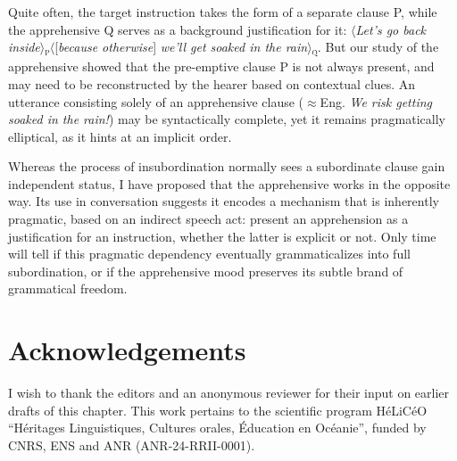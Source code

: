 \documentclass[output=paper,colorlinks,citecolor=brown]{langscibook}
\begin{document}
Quite often, the target instruction takes the form of a separate clause P, while the apprehensive Q serves as a background justification for it: ${\langle}$\textit{Let's go back inside}${\rangle}$\textsc{\textsubscript{p}}${\langle}$[\textit{because otherwise}] \textit{we'll get soaked in the rain}${\rangle}$\textsc{\textsubscript{q}}. But our study of the  apprehensive showed that the pre-emptive clause P is not always present, and may need to be reconstructed by the hearer based on contextual clues. An utterance consisting solely of an apprehensive clause (${\approx}$Eng. \textit{We risk getting soaked in the rain!}) may be syntactically complete, yet it remains pragmatically elliptical, as it hints at an implicit order.


Whereas the process of insubordination normally sees a subordinate clause gain independent status, I have proposed that the  apprehensive works in the opposite way. Its use in conversation suggests it encodes a mechanism that is inherently pragmatic, based on an indirect speech act: present an apprehension as a justification for an instruction, whether the latter is explicit or not. Only time will tell if this pragmatic dependency eventually grammaticalizes into full subordination, or if the apprehensive mood preserves its subtle brand of grammatical freedom.
 

\section*{Acknowledgements}
I wish to thank the editors and an anonymous reviewer for their input on earlier drafts of this chapter. This work pertains to the scientific program HéLiCéO ``Héritages Linguistiques, Cultures orales, Éducation en Océanie'', funded by CNRS, ENS and ANR (ANR-24-RRII-0001).
\end{document}
